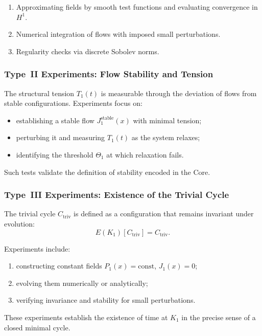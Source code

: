 \begin{enumerate}
    \item Approximating fields by smooth test functions and evaluating
          convergence in $H^1$.
    \item Numerical integration of flows with imposed small perturbations.
    \item Regularity checks via discrete Sobolev norms.
\end{enumerate}


\subsubsection{Type~II Experiments: Flow Stability and Tension}

The structural tension $T_1(t)$ is measurable through the deviation of flows
from stable configurations.
Experiments focus on:

\begin{itemize}
    \item establishing a stable flow $J_1^{\mathrm{stable}}(x)$ with minimal tension;
    \item perturbing it and measuring $T_1(t)$ as the system relaxes;
    \item identifying the threshold $\Theta_1$ at which relaxation fails.
\end{itemize}

Such tests validate the definition of stability encoded in the Core.


\subsubsection{Type~III Experiments: Existence of the Trivial Cycle}

The trivial cycle $C_{\mathrm{triv}}$ is defined as a configuration that
remains invariant under evolution:
\[
    E(K_1)[C_{\mathrm{triv}}] = C_{\mathrm{triv}}.
\]

Experiments include:

\begin{enumerate}
    \item constructing constant fields $P_1(x)=\mathrm{const}$,
          $J_1(x)=0$;
    \item evolving them numerically or analytically;
    \item verifying invariance and stability for small perturbations.
\end{enumerate}

These experiments establish the existence of time at $K_1$ in the precise
sense of a closed minimal cycle.


